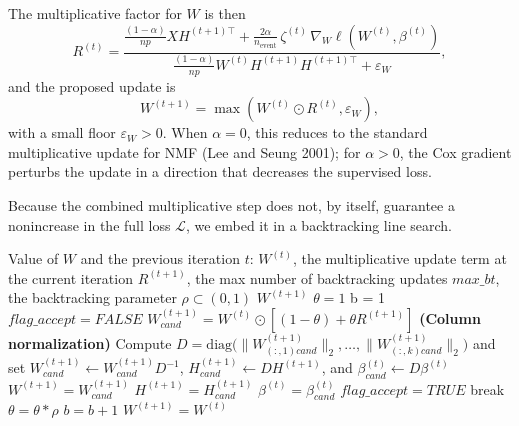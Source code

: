 \documentclass[
]{article}
\begin{document}
The multiplicative factor for \(W\) is then \begin{equation}
R^{(t)}
=
\frac{
  \frac{(1-\alpha)}{np} X H^{(t+1)\top}
  +\frac{2\alpha}{n_{\mathrm{event}}}\,\zeta^{(t)}\,\nabla_W \ell(W^{(t)},\beta^{(t)})
}{
  \frac{(1-\alpha)}{np} W^{(t)} H^{(t+1)}H^{(t+1)\top}
  +\varepsilon_W
},
\end{equation} and the proposed update is \begin{equation}
\label{eqn:W_update}
W^{(t+1)}
=
\max\!\left(
  W^{(t)} \odot R^{(t)},
  \varepsilon_W
\right),
\end{equation} with a small floor \(\varepsilon_W > 0\). When
\(\alpha=0\), this reduces to the standard multiplicative update for NMF
(Lee and Seung 2001); for \(\alpha>0\), the Cox gradient perturbs the
update in a direction that decreases the supervised loss.

Because the combined multiplicative step does not, by itself, guarantee
a nonincrease in the full loss \(\mathcal{L}\), we embed it in a
backtracking line search.

\begin{algorithm}[H]
\caption{$W$ update with backtracking}
\label{alg:backtrack}
    \begin{algorithmic}[1]
        \Require Value of $W$ and the previous iteration $t$: $W^{(t)}$, the multiplicative update term at the current iteration $R^{(t+1)}$, the max number of backtracking updates $max\_bt$, the backtracking parameter $\rho \subset (0,1)$
        \Ensure $W^{(t+1)}$
        \State $\theta =1$
        \State b = 1
        \State $flag\_accept = FALSE$
            \State $W^{(t+1)}_{cand} = W^{(t)} \odot [(1-\theta) + \theta R^{(t+1)}]$
            \State \textbf{(Column normalization)}
            \State \hspace{0.5cm} Compute $D = \mathrm{diag}\!\big(\lVert W^{(t+1)}_{(:,1)cand}\rVert_2,\dots,\lVert W^{(t+1)}_{(:,k)cand}\rVert_2\big)$
            \State \hspace{0.5cm} and set $W^{(t+1)}_{cand} \leftarrow W^{(t+1)}_{cand} D^{-1}$, $H^{(t+1)}_{cand} \leftarrow D H^{(t+1)}$, and $\beta^{(t)}_{cand} \leftarrow D \beta^{(t)}$
              \State $W^{(t+1)} = W^{(t+1)}_{cand}$
              \State $H^{(t+1)} = H^{(t+1)}_{cand}$
              \State $\beta^{(t)} = \beta^{(t)}_{cand}$
              \State $flag\_accept = TRUE$
              \State break
            \EndIf
            \State $\theta = \theta*\rho$
            \State $b = b + 1$
        \EndWhile
            \State $W^{(t+1)}=W^{(t)}$
        \EndIf
    \end{algorithmic}
\end{algorithm}
\end{document}
